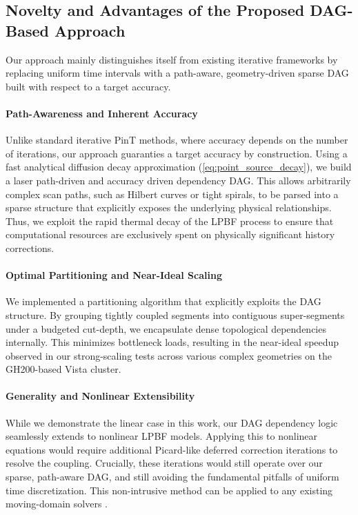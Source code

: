 \documentclass[conference]{IEEEtran}
\begin{document}
\subsection{Novelty and Advantages of the Proposed DAG-Based Approach}\label{seq:novelty}

Our approach mainly distinguishes itself from existing iterative frameworks by replacing uniform time intervals with a path-aware, geometry-driven sparse DAG built with respect to a target accuracy. 

\paragraph{Path-Awareness and Inherent Accuracy}
Unlike standard iterative PinT methods, where accuracy depends on the number of iterations, our approach guaranties a target accuracy by construction. Using a fast analytical diffusion decay approximation (\cref{eq:point_source_decay}), we build a laser path-driven and accuracy driven dependency DAG. This allows arbitrarily complex scan paths, such as Hilbert curves or tight spirals, to be parsed into a sparse structure that explicitly exposes the underlying physical relationships. Thus, we exploit the rapid thermal decay of the LPBF process to ensure that computational resources are exclusively spent on physically significant history corrections.

\paragraph{Optimal Partitioning and Near-Ideal Scaling}
We implemented a partitioning algorithm that explicitly exploits the DAG structure. By grouping tightly coupled segments into contiguous super-segments under a budgeted cut-depth, we encapsulate dense topological dependencies internally. This minimizes bottleneck loads, resulting in the near-ideal speedup observed in our strong-scaling tests across various complex geometries on the GH200-based Vista cluster.

\paragraph{Generality and Nonlinear Extensibility}
While we demonstrate the linear case in this work, our DAG dependency logic seamlessly extends to nonlinear LPBF models. Applying this to nonlinear equations would require additional Picard-like deferred correction iterations to resolve the coupling. Crucially, these iterations would still operate over our sparse, path-aware DAG, and still avoiding the fundamental pitfalls of uniform time discretization. This non-intrusive method can be applied to any existing moving-domain solvers \cite{aydin2026hermes, leonor2024go, li2023efficient}.
\end{document}
